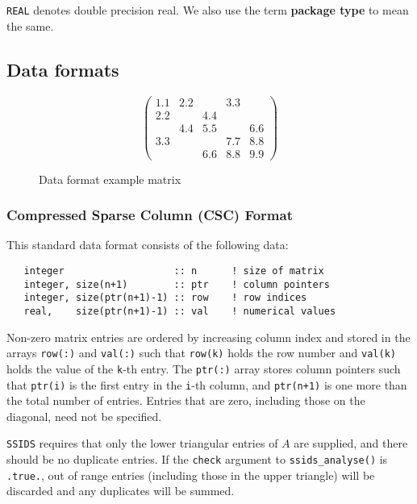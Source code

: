 \documentclass{spral}
\begin{document}
\noindent
{\tt REAL} denotes double precision real.
We also use the term {\bf package type} to mean the same.

\subsection{Data formats} \label{dataformats}

\begin{figure}
   \caption{ \label{format eg}
      Data format example matrix
   }
   $$
      \left( \begin{array}{ccccc}
         1.1 & 2.2 &     & 3.3 &     \\
         2.2 &     & 4.4 &     &     \\
             & 4.4 & 5.5 &     & 6.6 \\
         3.3 &     &     & 7.7 & 8.8 \\
             &     & 6.6 & 8.8 & 9.9
      \end{array} \right)
   $$
\end{figure}

\subsubsection{Compressed Sparse Column (CSC) Format} \label{cscformat}
This standard data format consists of the following data:
\begin{verbatim}
   integer                   :: n      ! size of matrix
   integer, size(n+1)        :: ptr    ! column pointers
   integer, size(ptr(n+1)-1) :: row    ! row indices
   real,    size(ptr(n+1)-1) :: val    ! numerical values
\end{verbatim}
Non-zero matrix entries are ordered by increasing column index and stored in
the arrays \texttt{row(:)} and \texttt{val(:)} such that \texttt{row(k)} holds
the row number and \texttt{val(k)} holds the value of the \texttt{k}-th entry.
The \texttt{ptr(:)} array stores column pointers such that \texttt{ptr(i)} is
the first entry in the \texttt{i}-th column, and \texttt{ptr(n+1)} is one more
than the total number of entries.
Entries that are zero, including those on the diagonal, need not be specified.

\texttt{SSIDS} requires that only the lower triangular entries of $A$ are
supplied, and there should be no duplicate entries. If the \texttt{check}
argument to
\texttt{ssids\_analyse()} is \texttt{.true.}, out of range entries (including
those in the upper triangle) will be discarded and any duplicates will be
summed.
\end{document}
